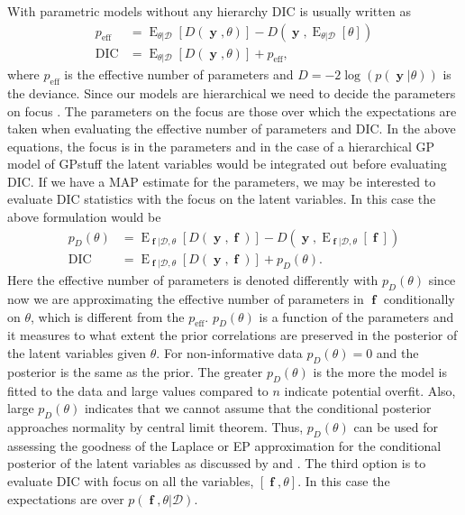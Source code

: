 \documentclass[twoside,11pt]{article}
\DeclareMathOperator{\f}{\mathbf{f}}
\DeclareMathOperator{\y}{\mathbf{y}}
\newcommand{\pkg}[1]{{\fontseries{b}\selectfont #1}}
\DeclareMathOperator{\E}{E}
\begin{document}
With parametric models without any hierarchy DIC is usually written as
%
\begin{align}
p_{\text{eff}} &= \E_{\theta|\mathcal{D}}[D(\y, \theta)] - D(\y,
\E_{\theta|\mathcal{D}}[\theta]) \\
\text{DIC} & = \E_{\theta|\mathcal{D}}[D(\y, \theta)] + p_{\text{eff}},
\end{align}
%
where $p_{\text{eff}}$ is the effective number of parameters and $D =
-2\log(p(\y|\theta))$ is the deviance. Since our models are
hierarchical we need to decide the parameters on focus \citep[see][for
discussion on this]{Spiegelhalter+Best+Carlin+Linde:2002}. The
parameters on the focus are those over which the expectations are
taken when evaluating the effective number of parameters and DIC. In
the above equations, the focus is in the parameters and in the
case of a hierarchical GP model of \pkg{GPstuff} the latent variables
would be integrated out before evaluating DIC. If we have a MAP
estimate for the parameters, we may be interested to evaluate DIC
statistics with the focus on the latent variables. In this case the
above formulation would be
%
\begin{align}
p_{D}(\theta) &= \E_{\f|\mathcal{D}, \theta}[D(\y, \f)] - D(\y,
\E_{\f|\mathcal{D}, \theta}[\f]) \label{DIC_focus_on_latent_variables1}\\
\text{DIC} & = \E_{\f|\mathcal{D},\theta}[D(\y, \f)] +
p_{D}(\theta).\label{DIC_focus_on_latent_variables2}
\end{align}
%
Here the effective number of parameters is denoted differently with
$p_{D}(\theta)$ since now we are approximating the effective number of
parameters in $\f$ conditionally on $\theta$, which is different from
the $p_{\text{eff}}$. $p_{D}(\theta)$ is a function of the
parameters and it measures to what extent the prior correlations
are preserved in the posterior of the latent variables given $\theta$.
For non-informative data $p_{D}(\theta)=0$ and the posterior is the
same as the prior. The greater $p_{D}(\theta)$ is the more the model
is fitted to the data and large values compared to $n$ indicate
potential overfit. Also, large $p_{D}(\theta)$ indicates that we
cannot assume that the conditional posterior approaches normality by
central limit theorem. Thus, $p_{D}(\theta)$ can be used for assessing
the goodness of the Laplace or EP approximation for the conditional
posterior of the latent variables as discussed by
\citet{Rue+Martino+Chopin:2009} and
\citet{Vanhatalo+Pietilainen+Vehtari:2010}. The third option is to
evaluate DIC with focus on all the variables, $[\f, \theta]$. In this
case the expectations are over $p(\f,\theta|\mathcal{D})$.
\end{document}
